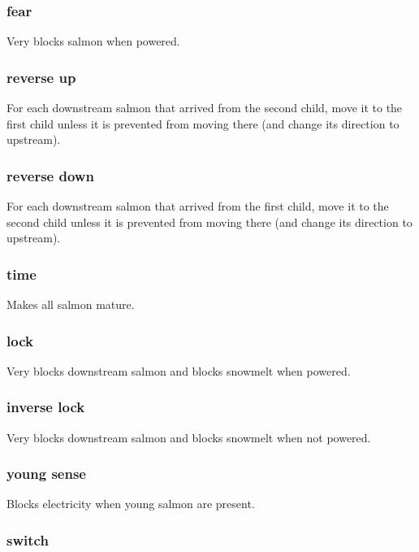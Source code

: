 \documentclass[10pt]{article}
\begin{document}
\subsubsection{fear}

Very blocks salmon when powered.

\subsubsection{reverse up}

For each downstream salmon that arrived from the second child, move it to the first child unless it is prevented from moving
there (and change its direction to upstream).

\subsubsection{reverse down}

For each downstream salmon that arrived from the first child, move it to the second child unless it is prevented from moving
there (and change its direction to upstream).

\subsubsection{time}

Makes all salmon mature.

\subsubsection{lock}

Very blocks downstream salmon and blocks snowmelt when powered.

\subsubsection{inverse lock}

Very blocks downstream salmon and blocks snowmelt when not powered.

\subsubsection{young sense}

Blocks electricity when young salmon are present.

\subsubsection{switch}
\end{document}
